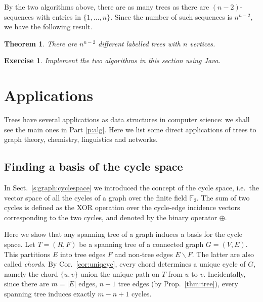 \documentclass[a4paper]{book}
\theoremstyle{changebreak}                %
\newtheorem{thm}[result]{Theorem}
\newtheorem{ex}[result]{Exercise}
\begin{document}
By the two algorithms above, there are as many trees as there are
$(n-2)$-sequences with entries in $\{1,\ldots,n\}$. Since the number
of such sequences is $n^{n-2}$, we have the following result.
\begin{thm}
There are $n^{n-2}$ different labelled trees with $n$ vertices.
\end{thm}

\begin{ex}
Implement the two algorithms in this section using Java.
\end{ex}

\section{Applications}
Trees have several applications as data structures in computer
science: we shall see the main ones in Part \ref{p:alg}. Here we list
some direct applications of trees to graph theory, chemistry, linguistics and
networks.

\subsection{Finding a basis of the cycle space}
In Sect.~\ref{s:graph:cyclespace} we introduced the concept of the
cycle space, i.e.~the vector space of all the
cycles of a graph over the finite field
$\mathbb{F}_2$. The sum of two cycles is defined as
the XOR operation over the cycle-edge incidence
vectors corresponding to the two
cycles, and denoted by the binary operator $\oplus$.

Here we show that any spanning tree of a graph
induces a basis for the cycle space. Let
$T=(R,F)$ be a spanning tree of a connected graph $G=(V,E)$. This
partitions $E$ into tree edges $F$ and non-tree edges
$E\smallsetminus F$. The latter are also called {\it
  chords}. By Cor.~\ref{cor:uniqcyc}, every chord
determines a unique cycle of $G$, namely the chord
$\{u,v\}$ union the unique path on $T$ from $u$ to
$v$. Incidentally, since there are $m=|E|$ edges, $n-1$ tree edges (by
Prop.~\ref{thm:tree}), every spanning tree induces exactly $m-n+1$
cycles.
\end{document}
